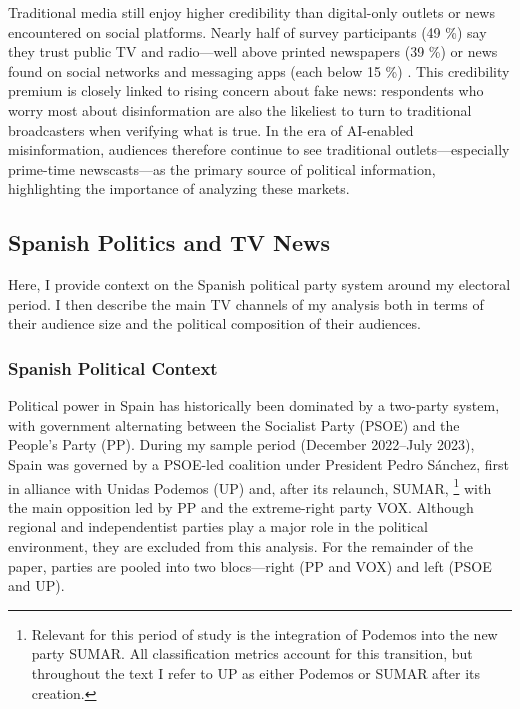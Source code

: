 \documentclass[12pt]{article}
\begin{document}
	
	

	
	
Traditional media still enjoy higher credibility than digital-only outlets or news encountered on social platforms. Nearly half  of survey participants (49 \%) say they trust public TV and radio—well above printed newspapers (39 \%) or news found on social networks and messaging apps (each below 15 \%) \citep{eurobarometer2022}. This credibility premium is closely linked to rising concern about fake news: respondents who worry most about disinformation are also the likeliest to turn to traditional broadcasters when verifying what is true. In the era of AI-enabled misinformation, audiences therefore continue to see traditional outlets—especially prime-time newscasts—as the primary source of political information, highlighting the importance of analyzing these markets. 
	
	
	
	
	
	
	\subsection{Spanish Politics and TV News}
	
	
	
Here, I provide context on the Spanish political party system around my electoral period. I then describe the main TV channels of my analysis both in terms of their audience size and  the political composition of their audiences. 

	
	
	
	\subsubsection*{Spanish Political Context}
	

	

	
	
	Political power in Spain has historically been dominated by a two-party system, with government alternating between the Socialist Party (PSOE) and the People’s Party (PP). During my sample period (December 2022–July 2023), Spain was governed by a PSOE-led coalition under President Pedro Sánchez, first in alliance with Unidas Podemos (UP) and, after its relaunch, SUMAR, \footnote{Relevant for this period of study is the integration of Podemos into the new party SUMAR. All classification metrics account for this transition, but throughout the text I refer to UP as either Podemos or SUMAR after its creation.} with the main opposition led by PP and the extreme-right party VOX. Although regional and independentist parties play a major role in the political environment, they are excluded from this analysis. For the remainder of the paper, parties are pooled into two blocs—right (PP and VOX) and left (PSOE and UP).
	
\end{document}
